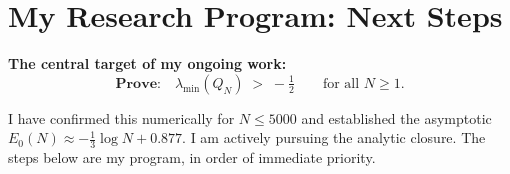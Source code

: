 \documentclass[12pt]{article}
\newcommand{\half}{\tfrac{1}{2}}
\begin{document}
\section{My Research Program: Next Steps}
\label{sec:open}

\begin{tcolorbox}[openbox]
\textbf{The central target of my ongoing work:}
\[
  \textbf{Prove:}\quad
  \lambda_{\min}(Q_N) \;>\; -\half
  \qquad\text{for all }N\ge1.
\]

I have confirmed this numerically for $N\le5000$ and established the asymptotic
$E_0(N) \approx -\tfrac{1}{3}\log N + 0.877$.
I am actively pursuing the analytic closure.
The steps below are my program, in order of immediate priority.
\end{tcolorbox}

\medskip
\end{document}
